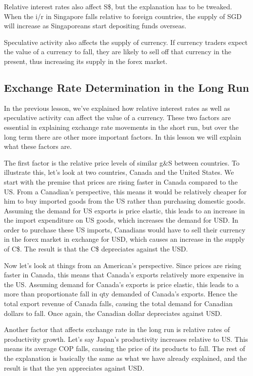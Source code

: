\documentclass[DIV=classic,11pt,numbers=noenddot,parskip]{scrartcl}
\begin{document}
Relative interest rates also affect S\$, but the explanation has to be tweaked.  When the i/r in Singapore falls relative to foreign countries, the supply of SGD will increase as Singaporeans start depositing funds overseas.

Speculative activity also affects the supply of currency. If currency traders expect the value of a currency to fall, they are likely to sell off that currency in the present, thus increasing its supply in the forex market.
\subsection{Exchange Rate Determination in the Long Run}
In the previous lesson, we’ve explained how relative interest rates as well as speculative activity can affect the value of a currency. These two factors are essential in explaining exchange rate movements in the short run, but over the long term there are other more important factors. In this lesson we will explain what these factors are.

The first factor is the relative price levels of similar g\&S between countries. To illustrate this, let’s look at two countries, Canada and the United States. We start with the premise that prices are rising faster in Canada compared to the US. From a Canadian’s perspective, this means it would be relatively cheaper for him to buy imported goods from the US rather than purchasing domestic goods. Assuming the demand for US exports is price elastic, this leads to an increase in the import expenditure on US goods, which increases the demand for USD. In order to purchase these US imports, Canadians would have to sell their currency in the forex market in exchange for USD, which causes an increase in the supply of C\$. The result is that the C\$ depreciates against the USD.

Now let’s look at things from an American’s perspective. Since prices are rising faster in Canada, this means that Canada’s exports relatively more expensive in the US. Assuming demand for Canada’s exports is price elastic, this leads to a more than proportionate fall in qty demanded of Canada’s exports. Hence the total export revenue of Canada falls, causing the total demand for Canadian dollars to fall. Once again, the Canadian dollar depreciates against USD.

Another factor that affects exchange rate in the long run is relative rates of productivity growth. Let’s say Japan’s productivity increases relative to US. This means its average COP falls, causing the price of its products to fall. The rest of the explanation is basically the same as what we have already explained, and the result is that the yen appreciates against USD.
\end{document}
